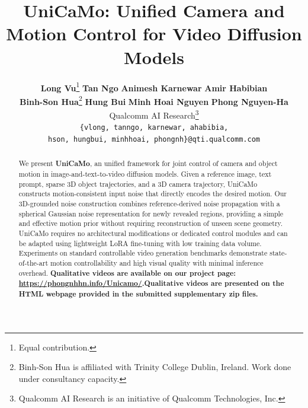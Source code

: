 \ifdefined\arxivbuild\else\documentclass{article}\fi %
\title{UniCaMo: Unified Camera and Motion Control for Video Diffusion Models}
\author{%
  \textbf{Long Vu}\thanks{Equal contribution.}\quad
  \textbf{Tan Ngo}\footnotemark[1]\quad
  \textbf{Animesh Karnewar}\quad
  \textbf{Amir Habibian} \\[3pt]
  \textbf{Binh-Son Hua}\thanks{Binh-Son Hua is affiliated with Trinity College Dublin, Ireland. Work done under consultancy capacity.}\quad
  \textbf{Hung Bui}\quad
  \textbf{Minh Hoai Nguyen}\quad
  \textbf{Phong Nguyen-Ha} \\[6pt]
  Qualcomm AI Research\thanks{Qualcomm AI Research is an initiative of Qualcomm Technologies, Inc.} \\[3pt]
  \texttt{\{vlong, tanngo, karnewar, ahabibia,} \\
  \texttt{hson, hungbui, minhhoai, phongnh\}@qti.qualcomm.com}
}
\begin{document}

\maketitle
\ifdefined\arxivbuild\lhead{}\fi



\begin{abstract}
We present \textbf{UniCaMo}, an unified framework for joint control of camera and object motion in image-and-text-to-video diffusion models. Given a reference image, text prompt, sparse 3D object trajectories, and a 3D camera trajectory, UniCaMo constructs motion-consistent input noise that directly encodes the desired motion. Our 3D-grounded noise construction combines reference-derived noise propagation with a spherical Gaussian noise representation for newly revealed regions, providing a simple and effective motion prior without requiring reconstruction of unseen scene geometry. UniCaMo requires no architectural modifications or dedicated control modules and can be adapted using lightweight LoRA fine-tuning with low training data volume. Experiments on standard controllable video generation benchmarks demonstrate state-of-the-art motion controllability and high visual quality with minimal inference overhead. \ifdefined\arxivbuild\textbf{Qualitative videos are available on our project page: \url{https://phongnhhn.info/Unicamo/}.}\else\textbf{Qualitative videos are presented on the HTML webpage provided in the submitted supplementary zip files.}\fi


\end{abstract}
\end{document}
